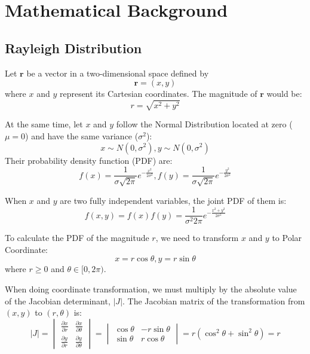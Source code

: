 \chapter{Mathematical Background}

\section{Rayleigh Distribution} 
\label{app:rayleigh}

Let $\boldsymbol{r}$ be a vector in a two-dimensional space defined by \[\boldsymbol{r} = (x,y)\] where $x$ and $y$ represent its Cartesian coordinates. The magnitude of $\boldsymbol{r}$ would be:
\begin{equation}
    r = \sqrt{x^2+y^2}
    \label{eq-app:m_r}
\end{equation}

At the same time, let $x$ and $y$ follow the Normal Distribution located at zero ($\mu=0$) and have the same variance ($\sigma^2$): \[x \sim N(0,\sigma^2), y \sim N(0,\sigma^2)\] Their probability density function (PDF) are:
\begin{equation}
    f(x)=\frac{1}{\sigma\sqrt{2\pi}}e^{-\frac{x^2}{2\sigma^2}}, f(y)=\frac{1}{\sigma\sqrt{2\pi}}e^{-\frac{y^2}{2\sigma^2}}
    \label{eq-app:normal}
\end{equation}

When $x$ and $y$ are two fully independent variables, the joint PDF of them is:
\begin{equation}
    f(x,y)=f(x)f(y)=\frac{1}{\sigma^2 2\pi}e^{-\frac{x^2+y^2}{2\sigma^2}}
    \label{eq-app:jpdf}
\end{equation}

To calculate the PDF of the magnitude $r$, we need to transform $x$ and $y$ to Polar Coordinate:\[x=r\cos{\theta},y=r\sin{\theta}\]
where $r\geq0$ and $\theta \in [0, 2\pi)$.

When doing coordinate transformation, we must multiply by the absolute value of the Jacobian determinant, $|J|$. The Jacobian matrix of the transformation from $(x,y)$ to $(r,\theta)$ is:
\begin{equation}
|J| = \begin{vmatrix} \frac{\partial x}{\partial r} & \frac{\partial x}{\partial \theta} \\ \frac{\partial y}{\partial r} & \frac{\partial y}{\partial \theta} \end{vmatrix} = \begin{vmatrix} \cos\theta & -r\sin\theta \\ \sin\theta & r\cos\theta \end{vmatrix} = r(\cos^2\theta + \sin^2\theta) = r
\label{eq-app:jacob}
\end{equation}

